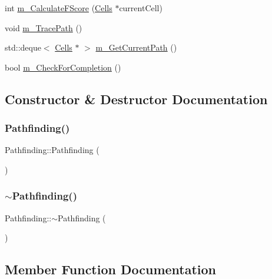 \begin{DoxyCompactItemize}
\item 
int \mbox{\hyperlink{class_pathfinding_a5df6c9a7c337bf4b416ff61dcf57dd98}{m\+\_\+\+Calculate\+F\+Score}} (\mbox{\hyperlink{class_cells}{Cells}} $\ast$current\+Cell)
\item 
void \mbox{\hyperlink{class_pathfinding_abca4c4bbc051a99323d29106127fb389}{m\+\_\+\+Trace\+Path}} ()
\item 
std\+::deque$<$ \mbox{\hyperlink{class_cells}{Cells}} $\ast$ $>$ \mbox{\hyperlink{class_pathfinding_a287047690fb8d2f4d72dbda8365b1f84}{m\+\_\+\+Get\+Current\+Path}} ()
\item 
bool \mbox{\hyperlink{class_pathfinding_a6d557c82148fd127b2c53add89158c5e}{m\+\_\+\+Check\+For\+Completion}} ()
\end{DoxyCompactItemize}


\subsection{Constructor \& Destructor Documentation}
\mbox{\label{class_pathfinding_aae14d204c5f9ee6b184764f874711341}} 
\subsubsection{\texorpdfstring{Pathfinding()}{Pathfinding()}}
{\footnotesize\ttfamily Pathfinding\+::\+Pathfinding (\begin{DoxyParamCaption}{ }\end{DoxyParamCaption})}

\mbox{\label{class_pathfinding_a1869823af12d301105cf1cedbe9a8dc5}} 
\subsubsection{\texorpdfstring{$\sim$\+Pathfinding()}{~Pathfinding()}}
{\footnotesize\ttfamily Pathfinding\+::$\sim$\+Pathfinding (\begin{DoxyParamCaption}{ }\end{DoxyParamCaption})}



\subsection{Member Function Documentation}
\mbox{\label{class_pathfinding_a17051c2f3466edb6299444e87d6033fc}} 
